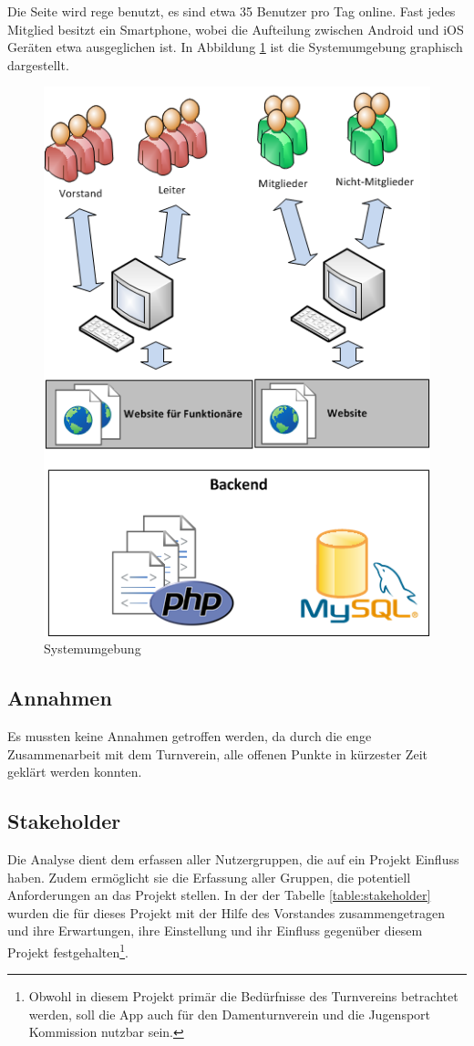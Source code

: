 Die Seite wird rege benutzt, es sind etwa 35 Benutzer pro Tag online. Fast jedes Mitglied besitzt ein Smartphone, wobei die Aufteilung zwischen Android und iOS Geräten etwa ausgeglichen ist. In Abbildung \ref{fig:systemumgebung} ist die Systemumgebung graphisch dargestellt.
\begin{figure}[h]
\centering
\includegraphics[scale=0.95]{images/visio/systemumgebung.png}
\caption{Systemumgebung}
\label{fig:systemumgebung}
\end{figure}

\FloatBarrier
\subsection{Annahmen}\label{annahmen}
Es mussten keine Annahmen getroffen werden, da durch die enge Zusammenarbeit mit dem Turnverein, alle offenen Punkte in kürzester Zeit geklärt werden konnten.

\newpage
\subsection{Stakeholder}\label{stakeholder}
Die  Analyse dient dem erfassen aller Nutzergruppen, die auf ein Projekt Einfluss haben. Zudem ermöglicht sie die Erfassung aller Gruppen, die potentiell Anforderungen an das Projekt stellen. In der der Tabelle \ref{table:stakeholder} wurden die  für dieses Projekt mit der Hilfe des Vorstandes zusammengetragen und ihre Erwartungen, ihre Einstellung und ihr Einfluss gegenüber diesem Projekt festgehalten\footnote{Obwohl in diesem Projekt primär die Bedürfnisse des Turnvereins betrachtet werden, soll die App auch für den Damenturnverein und die Jugensport Kommission nutzbar sein.}. 

